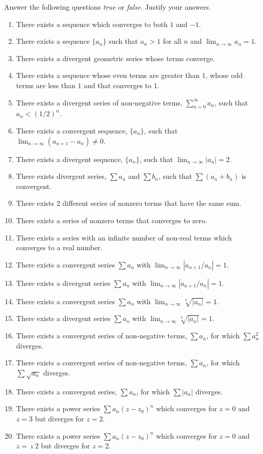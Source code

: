{\begin{Exercise}
  \label{exercise series true false}
  Answer the following questions \textit{true} or \textit{false}.  
  Justify your answers.
  \begin{enumerate}
  \item
    There exists a sequence which converges to both $1$ and $-1$.
  \item
    There exists a sequence $\{ a_n \}$ such that $a_n > 1$ for all $n$ and 
    $\lim_{n \to \infty} a_n = 1$.
  \item
    There exists a divergent geometric series whose terms converge.
  \item
    There exists a sequence whose even terms are greater than $1$,
    whose odd terms are less than $1$ and that converges to $1$.
  \item
    There exists a divergent series of non-negative terms,
    $\sum_{n = 0}^\infty a_n$, such that $a_n < (1/2)^n$.
  \item
    There exists a convergent sequence, $\{ a_n \}$, such that 
    $\lim_{n \to \infty} (a_{n+1} - a_n) \neq 0$.
  \item
    There exists a divergent sequence, $\{ a_n \}$, such that
    $\lim_{n \to \infty} |a_n| = 2$.
  \item
    There exists divergent series, $\sum a_n$ and $\sum b_n$, such that
    $\sum (a_n + b_n)$ is convergent.
  \item
    There exists 2 different series of nonzero terms that have the same sum.
  \item
    There exists a series of nonzero terms that converges to zero.
  \item
    There exists a series with an infinite number of non-real terms which
    converges to a real number.
  \item
    There exists a convergent series $\sum a_n$ with 
    $\lim_{n \to \infty} |a_{n+1}/a_n| = 1$.
  \item
    There exists a divergent series $\sum a_n$ with 
    $\lim_{n \to \infty} |a_{n+1}/a_n| = 1$.
  \item
    There exists a convergent series $\sum a_n$ with 
    $\lim_{n \to \infty} \sqrt[n]{|a_n|} = 1$.
  \item
    There exists a divergent series $\sum a_n$ with 
    $\lim_{n \to \infty} \sqrt[n]{|a_n|} = 1$.
  \item
    There exists a convergent series of non-negative terms, $\sum a_n$,
    for which $\sum a_n^2$ diverges.
  \item
    There exists a convergent series of non-negative terms, $\sum a_n$,
    for which $\sum \sqrt{a_n}$ diverges.
  \item
    There exists a convergent series, $\sum a_n$,
    for which $\sum |a_n|$ diverges.
  \item
    There exists a power series $\sum a_n (z - z_0)^n$ which converges for 
    $z = 0$ and $z = 3$ but diverges for $z = 2$.
  \item
    There exists a power series $\sum a_n (z - z_0)^n$ which converges for 
    $z = 0$ and $z = \imath 2$ but diverges for $z = 2$.
  \end{enumerate}


\end{Exercise}}
